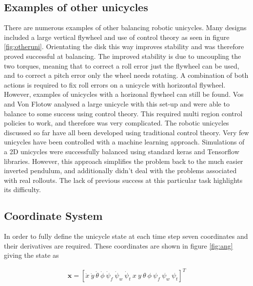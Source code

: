 \documentclass[twoside,twocolumn,12pt]{article}
\begin{document}
\subsection{Examples of other unicycles}
There are numerous examples of other balancing robotic unicycles. Many designs included a large vertical flywheel and use of control theory as seen in figure \ref{fig:otheruni}. Orientating the disk this way improves stability and was therefore proved successful at balancing. The improved stability is due to uncoupling the two torques, meaning that to correct a roll error just the flywheel can be used, and to correct a pitch error only the wheel needs rotating. A combination of both actions is required to fix roll errors on a unicycle with horizontal flywheel.
\newline
However, examples of unicycles with a horizonal flywheel can still be found. \cite{other3}  Vos and Von Flotow analysed a large unicycle with this set-up and were able to balance to some success using control theory. This required multi region control policies to work, and therefore was very complicated.
\newline
The robotic unicycles discussed so far have all been developed using traditional control theory. Very few unicycles have been controlled with a machine learning approach. Simulations of a 2D unicycles were successfully balanced \cite{other4} using standard keras and Tensorflow libraries. However, this approach simplifies the problem back to the much easier inverted pendulum, and additionally didn't deal with the problems associated with real rollouts. The lack of previous success at this particular task highlights its difficulty.

\clearpage
{}
\subsection{Coordinate System}
In order to fully define the unicycle state at each time step seven coordinates and their derivatives are required. These coordinates are shown in figure \ref{fig:ang} giving the state as

\begin{align*}
\textbf{x} = [\dot{x} \: \dot{y}\: \dot{\theta}\: \dot{\phi}\: \dot{\psi}_f\: \dot{\psi}_w \:\dot{\psi}_t \: x \: y \: \theta \: \phi \: \psi_f \: \psi_w \: \psi_t]^T
\end{align*}
\end{document}
